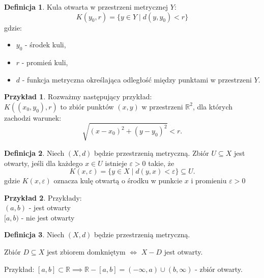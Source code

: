 \documentclass{article}
\theoremstyle{definition}
\newtheorem{de}{Definicja}[subsection]
\theoremstyle{definition}
\theoremstyle{definition}
\newtheorem{pk}{Przykład}[subsection]
\theoremstyle{definition}
\theoremstyle{definition}
\theoremstyle{definition}
\theoremstyle{definition}
\begin{document}
\begin{de}
Kula otwarta w przestrzeni metrycznej \( Y \):
\[
K(y_0, r) = \{ y \in Y \mid d(y, y_0) < r \}
\]
gdzie:
\begin{itemize}
    \item \( y_0 \) - środek kuli,
    \item \( r \) - promień kuli,
    \item \( d \) - funkcja metryczna określająca odległość między punktami w przestrzeni \( Y \).
\end{itemize}
\end{de}

\begin{pk}
    Rozważmy następujący przykład: \\
    \( K((x_0,y_0), r) \) to zbiór punktów \( (x,y) \) w przestrzeni \( \mathbb{R}^2 \), dla których zachodzi warunek:
    \[
    \sqrt{(x-x_0)^2 + (y-y_0)^2} < r.
    \]
    \begin{center}
    \end{center}
\end{pk}

\begin{de}
    Niech \( (X,d) \) będzie przestrzenią metryczną. Zbiór \( U \subseteq X \) jest otwarty, jeśli dla każdego \( x \in U \) istnieje \( \varepsilon > 0 \) takie, że
    \[
    K(x,\varepsilon) = \{ y \in X \mid d(y,x) < \varepsilon \} \subseteq U.
    \]
    gdzie \( K(x,\varepsilon) \) oznacza kulę otwartą o środku w punkcie \( x \) i promieniu \( \varepsilon > 0 \)
\end{de}

\begin{pk}
    Przykłady: \\
    \( (a,b) \) - jest otwarty\\
    \( [a,b) \) - nie jest otwarty
\end{pk}

\begin{de}
    Niech \( (X,d) \) będzie przestrzenią metryczną. 
    \begin{center}
        Zbiór \( D \subseteq X \) jest zbiorem domkniętym \(\iff\) \( X - D \) jest otwarty.
    \end{center}
    Przykład: \( [a,b] \subset \mathbb{R} \implies \mathbb{R} - [a,b] = (-\infty, a) \cup (b, \infty) \) - zbiór otwarty.
\end{de}
\end{document}
